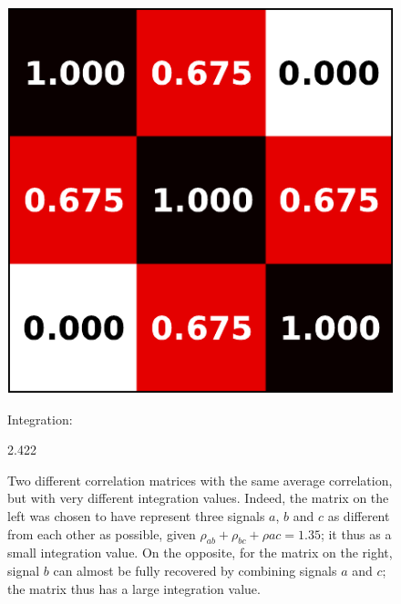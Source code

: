 \documentclass[5p]{elsarticle}
\begin{document}
\begin{figure}
\begin{minipage}{.033\linewidth}
\end{minipage}%
\hfill%
\begin{minipage}{.2\linewidth}
    \includegraphics[width=\linewidth]{correlation_ex2.pdf}
\end{minipage}%
\begin{minipage}{.19\linewidth}
    \center\sffamily
    {\small Integration:}

    2.422
\end{minipage}%
\hspace*{2ex}%

\caption{Two different correlation matrices with the same average
correlation, but with very different integration values. Indeed, the
matrix on the left was chosen to have represent three signals $a$, $b$
and $c$ as different from each other as possible, given $\rho_{ab} +
\rho_{bc} + \rho{ac} = 1.35$; it thus as a small integration value. On
the opposite, for the matrix on the right, signal $b$ can almost be fully
recovered by combining signals $a$ and $c$; the matrix thus has a large
integration value.
\label{fig:integration}}
\end{figure}
\end{document}
